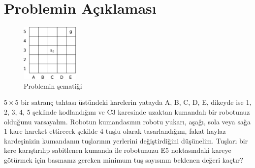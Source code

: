 \vspace{-1mm}
\section{Problemin A\c{c}{\i}klamas{\i}}
%
\begin{figure} %
    \vspace{-5mm}
    \centering
    \includegraphics[width=0.25\textwidth]{./figures/drawing.eps}
    \caption{Problemin \c{s}emati\u{g}i}
    \label{fig:schematic}
    \vspace{-5mm}
\end{figure}
%
$5 \times 5$ bir satran\c{c} tahtas{\i} \"{u}st\"{u}ndeki karelerin yatayda A,
B, C, D, E, dikeyde ise 1, 2, 3, 4, 5 \c{s}eklinde kodland{\i}\u{g}{\i}n{\i} ve
C3 karesinde uzaktan kumandal{\i} bir robotunuz oldu\u{g}unu varsayal{\i}m.
Robotun kumandas{\i}n{\i}n robotu yukar{\i}, a\c{s}a\u{g}{\i}, sola veya
sa\u{g}a 1 kare hareket ettirecek \c{s}ekilde 4 tu\c{s}lu olarak
tasarland{\i}\u{g}{\i}n{\i}, fakat haylaz karde\c{s}inizin kumandan{\i}n
tu\c{s}lar{\i}n{\i}n yerlerini de\u{g}i\c{s}tirdi\u{g}ini d\"{u}\c{s}\"{u}nelim.
Tu\c{s}lar{\i} bir kere kar{\i}\c{s}t{\i}r{\i}l{\i}p sabitlenen kumanda ile
robotunuzu E5 noktas{\i}ndaki kareye g\"{o}t\"{u}rmek i\c{c}in basman{\i}z
gereken minimum tu\c{s} say{\i}s{\i}n{\i}n beklenen de\u{g}eri ka\c{c}t{\i}r?